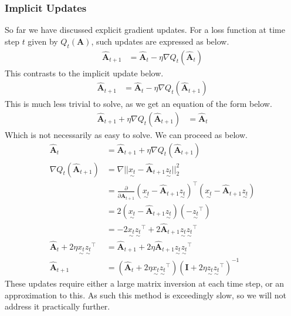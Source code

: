 \documentclass[12pt,a4paper]{article} %
\newcommand{\ve}[1]{\underset{\sim}{#1}}
\begin{document}
\subsubsection{Implicit Updates}
So far we have discussed explicit gradient updates. For a loss function at time step $t$ given by $Q_t(\pmb{A})$, such updates are expressed as below.
\begin{align*}
    \hat{\pmb{A}}_{t+1}&=\hat{\pmb{A}}_{t}-\eta\nabla Q_t(\hat{\pmb{A}}_{t})
\end{align*}
This contrasts to the implicit update below.
\begin{align*}
    \hat{\pmb{A}}_{t+1}&=\hat{\pmb{A}}_{t}-\eta\nabla Q_t(\hat{\pmb{A}}_{t+1})
\end{align*}
This is much less trivial to solve, as we get an equation of the form below.
\begin{align*}
    \hat{\pmb{A}}_{t+1}+\eta\nabla Q_t(\hat{\pmb{A}}_{t+1})&=\hat{\pmb{A}}_{t}
\end{align*}
Which is not necessarily as easy to solve. We can proceed as below.
\begin{align*}
    \hat{\pmb{A}}_{t}&=\hat{\pmb{A}}_{t+1}+\eta\nabla Q_t(\hat{\pmb{A}}_{t+1})\\
    \nabla Q_t(\hat{\pmb{A}}_{t+1})&=\nabla ||\ve{x_t}-\hat{\pmb{A}}_{t+1}\ve{z_t}||_2^2\\
    &=\frac{\partial}{\partial\hat{\pmb{A}}_{t+1}} (\ve{x_t}-\hat{\pmb{A}}_{t+1}\ve{z_t})^\top(\ve{x_t}-\hat{\pmb{A}}_{t+1}\ve{z_t})\\
    &=2(\ve{x_t}-\hat{\pmb{A}}_{t+1}\ve{z_t})(-\ve{z_t}^\top)\\
    &=-2\ve{x_t}\ve{z_t}^\top+2\hat{\pmb{A}}_{t+1}\ve{z_t}\ve{z_t}^\top\\
    \hat{\pmb{A}}_{t}+2\eta\ve{x_t}\ve{z_t}^\top&=\hat{\pmb{A}}_{t+1}+2\eta\hat{\pmb{A}}_{t+1}\ve{z_t}\ve{z_t}^\top\\
    \hat{\pmb{A}}_{t+1}&=(\hat{\pmb{A}}_{t}+2\eta\ve{x_t}\ve{z_t}^\top)(\pmb{I}+2\eta\ve{z_t}\ve{z_t}^\top)^{-1}
\end{align*}
These updates require either a large matrix inversion at each time step, or an approximation to this. As such this method is exceedingly slow, so we will not address it practically further.
\end{document}
